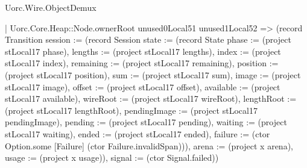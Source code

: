 \begin{lexlean}{Uorc.Wire.ObjectDemux}
\begin{semanticmodule}
{        | Uorc.Core.Heap::Node.ownerRoot unused0Local51 unused1Local52 => (record Transition {session := (record Session {state := (record State {phase := (project stLocal17 phase), lengths := (project stLocal17 lengths), index := (project stLocal17 index), remaining := (project stLocal17 remaining), position := (project stLocal17 position), sum := (project stLocal17 sum), image := (project stLocal17 image), offset := (project stLocal17 offset), available := (project stLocal17 available), wireRoot := (project stLocal17 wireRoot), lengthRoot := (project stLocal17 lengthRoot), pendingImage := (project stLocal17 pendingImage), pending := (project stLocal17 pending), waiting := (project stLocal17 waiting), ended := (project stLocal17 ended), failure := (ctor Option.some [Failure] (ctor Failure.invalidSpan))}), arena := (project x arena), usage := (project x usage)}), signal := (ctor Signal.failed)})
}
\end{semanticmodule}
\end{lexlean}
